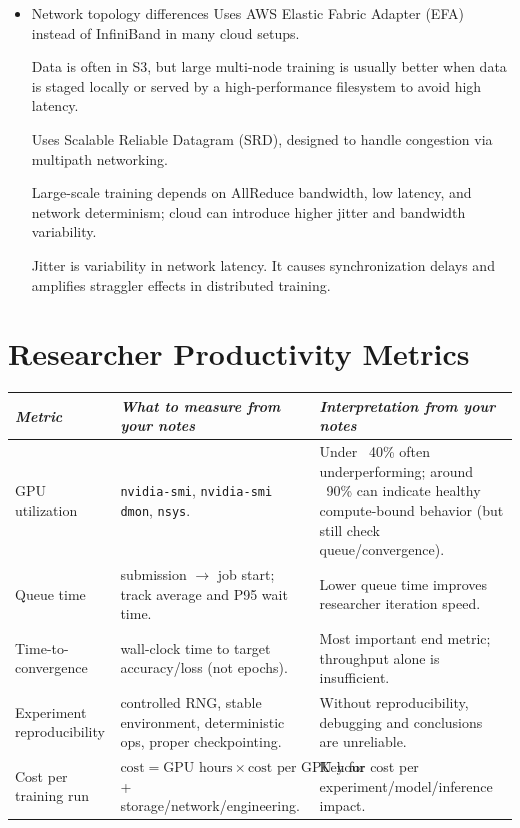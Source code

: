 \documentclass[12pt]{article}
\let\origtextbf\textbf
\renewcommand{\textbf}[1]{\origtextbf{\textit{#1}}}
\begin{document}
\begin{itemize}
With autoscaling, a job can start at minimum nodes and grow toward max nodes as more capacity arrives.

\item Network topology differences
Uses AWS Elastic Fabric Adapter (EFA) instead of InfiniBand in many cloud setups.

Data is often in S3, but large multi-node training is usually better when data is staged locally or served by a high-performance filesystem to avoid high latency.

Uses Scalable Reliable Datagram (SRD), designed to handle congestion via multipath networking.

Large-scale training depends on AllReduce bandwidth, low latency, and network determinism; cloud can introduce higher jitter and bandwidth variability.

Jitter is variability in network latency. It causes synchronization delays and amplifies straggler effects in distributed training.

\end{itemize}

\section{Researcher Productivity Metrics}

{\footnotesize
\begin{tabularx}{\textwidth}{|>{\raggedright\arraybackslash}p{2.8cm}|X|X|}
\hline
\textbf{Metric} & \textbf{What to measure from your notes} & \textbf{Interpretation from your notes} \\
\hline
GPU utilization & \texttt{nvidia-smi}, \texttt{nvidia-smi dmon}, \texttt{nsys}. & Under ~40\% often underperforming; around ~90\% can indicate healthy compute-bound behavior (but still check queue/convergence). \\
\hline
Queue time & submission \(\rightarrow\) job start; track average and P95 wait time. & Lower queue time improves researcher iteration speed. \\
\hline
Time-to-convergence & wall-clock time to target accuracy/loss (not epochs). & Most important end metric; throughput alone is insufficient. \\
\hline
Experiment reproducibility & controlled RNG, stable environment, deterministic ops, proper checkpointing. & Without reproducibility, debugging and conclusions are unreliable. \\
\hline
Cost per training run & \(\text{cost}=\text{GPU hours}\times\text{cost per GPU hour}\) + storage/network/engineering. & Key for cost per experiment/model/inference impact. \\
\hline
\end{tabularx}
}
\end{document}
